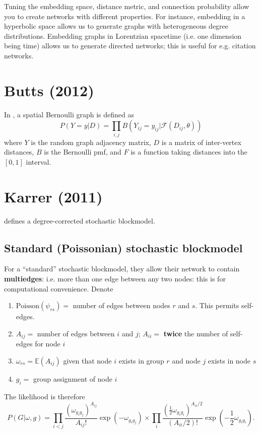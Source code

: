 \documentclass[11pt]{article}
\numberwithin{equation}{section}
\begin{document}
Tuning the embedding space, distance metric, and connection probability allow you to create networks with different properties. For instance, embedding in a hyperbolic space allows us to generate graphs with heterogeneous degree distributions. Embedding graphs in Lorentzian spacetime (i.e. one dimension being time) allows us to generate directed networks; this is useful for e.g. citation networks.

\section{Butts (2012)}
In \citep{Butts12}, a spatial Bernoulli graph is defined as 
\begin{equation}
P(Y=y|D) = \prod_{i,j} B(Y_{ij} = y_{ij}| \mathcal{F}(D_{ij}, \theta))
\end{equation}
\noindent where $Y$ is the random graph adjacency matrix, $D$ is a matrix of inter-vertex distances, $B$ is the Bernoulli pmf, and $F$ is a function taking distances into the $[0,1]$ interval.


\section{Karrer (2011)}
\citep{Karrer11} defines a degree-corrected stochastic blockmodel. 

\subsection{Standard (Poissonian) stochastic blockmodel}
For a ``standard'' stochastic blockmodel, they allow their network to contain \textbf{multiedges}: i.e. more than one edge between any two nodes: this is for computational convenience. Denote
\begin{enumerate}[nosep]
\item $\text{Poisson}(\psi_{rs})=$ number of edges between nodes $r$ and $s$. This permits self-edges.
\item $A_{ij} = $ number of edges between $i$ and $j$; $A_{ii} = $ \textbf{twice} the number of self-edges for node $i$
\item $\omega_{rs}= \mathbb{E}(A_{ij})$ given that node $i$ exists in group $r$ and node $j$ exists in node $s$
\item $g_i=$ group assignment of node $i$
\end{enumerate}
\noindent The likelihood is therefore
\begin{equation}
P(G|\omega, g) = \prod_{i<j} \frac{(\omega_{g_i g_j})^{A_{ij}}}{A_{ij}!}\exp(- \omega_{g_i g_j}) \times \prod_{i} \frac{(\frac{1}{2}\omega_{g_i g_i})^{A_{ii}/2}}{(A_{ii}/2)!}\exp(- \frac{1}{2} \omega_{g_i g_i}).
\end{equation}
\end{document}
